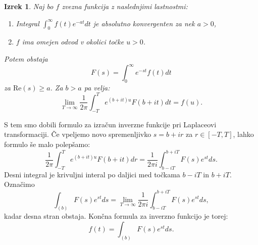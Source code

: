 \documentclass[12pt,a4paper]{amsart}
\theoremstyle{definition} %
\theoremstyle{plain} %
\newtheorem{izrek}[definicija]{Izrek}
\begin{document}
\begin{izrek}
    Naj bo $f$ zvezna funkcija z naslednjimi lastnostmi:
    \begin{enumerate}
        \item[(1)]Integral $\int_0^{\infty}f(t)e^{-at}dt$ je absolutno konvergenten za nek $a>0$,
        \item[(2)]$f$ ima omejen odvod v okolici točke $u>0$.  
    \end{enumerate}
    Potem obstaja
    \[F(s)=\int_0^{\infty}e^{-st}f(t)dt\]
    za $\text{Re}(s)\geq a$. Za $b>a$ pa velja:
    \[\lim_{T\to\infty}\frac{1}{2\pi}\int_{-T}^{T}e^{(b+it)u}F(b+it)dt=f(u).\]
\end{izrek}


S tem smo dobili formulo za izračun inverzne funkcije pri Laplaceovi transformaciji.
Če vpeljemo novo spremenljivko $s=b+ir$ za $r\in[-T,T]$, lahko formulo še malo polepšamo:
\[\frac{1}{2\pi}\int_{-T}^{T}e^{(b+it)u}F(b+it)dr=\frac{1}{2\pi i}\int_{b-iT}^{b+iT}F(s)e^{st}ds.\]
Desni integral je krivuljni interal po daljici med točkama $b-iT$ in $b+iT$. Označimo
\[ \int_{(b)}F(s)e^{st}ds=\lim_{T\to\infty}\frac{1}{2\pi i}\int_{b-iT}^{b+iT}F(s)e^{st}ds,\]
kadar desna stran obstaja.
Končna formula za inverzno funkcijo je torej:
\[f(t)=\int_{(b)}F(s)e^{st}ds.\]
\end{document}
